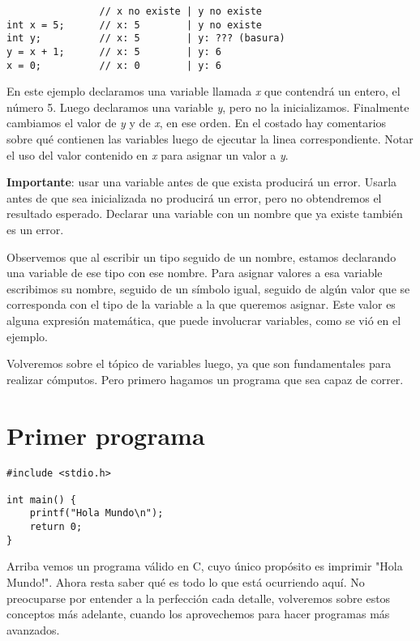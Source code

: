 \documentclass[10pt]{article}
\begin{document}
\begin{lstlisting}
                // x no existe | y no existe
int x = 5;      // x: 5        | y no existe
int y;          // x: 5        | y: ??? (basura)
y = x + 1;      // x: 5        | y: 6
x = 0;          // x: 0        | y: 6

\end{lstlisting}

En este ejemplo declaramos una variable llamada \textit{x} que contendrá un entero, el número 5. Luego declaramos una variable \textit{y}, pero no la inicializamos. Finalmente cambiamos el valor de \textit{y} y de \textit{x}, en ese orden. En el costado hay comentarios sobre qué contienen las variables luego de ejecutar la linea correspondiente. Notar el uso del valor contenido en \textit{x} para asignar un valor a \textit{y}.

\bigskip

\textbf{Importante}: usar una variable antes de que exista producirá un error. Usarla antes de que sea inicializada no producirá un error, pero no obtendremos el resultado esperado. Declarar una variable con un nombre que ya existe también es un error.

\bigskip

Observemos que al escribir un tipo seguido de un nombre, estamos declarando una variable de ese tipo con ese nombre. Para asignar valores a esa variable escribimos su nombre, seguido de un símbolo igual, seguido de algún valor que se corresponda con el tipo de la variable a la que queremos asignar. Este valor es alguna expresión matemática, que puede involucrar variables, como se vió en el ejemplo.

\bigskip

Volveremos sobre el tópico de variables luego, ya que son fundamentales para realizar cómputos. Pero primero hagamos un programa que sea capaz de correr.

\section{Primer programa}

\begin{lstlisting}
#include <stdio.h>

int main() {
	printf("Hola Mundo\n");
	return 0;
}
\end{lstlisting}

Arriba vemos un programa válido en C, cuyo único propósito es imprimir "Hola Mundo!". Ahora resta saber qué es todo lo que está ocurriendo aquí. No preocuparse por entender a la perfección cada detalle, volveremos sobre estos conceptos más adelante, cuando los aprovechemos para hacer programas más avanzados.
\end{document}
